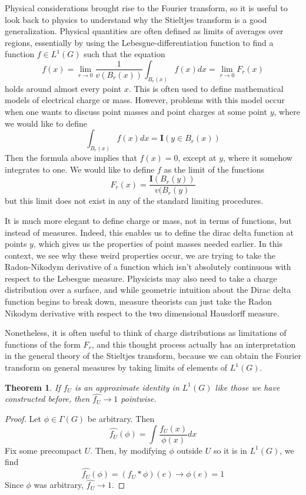 \documentclass{article}
\theoremstyle{plain}
\newtheorem{theorem}{Theorem}
\theoremstyle{definition}
\begin{document}
Physical considerations brought rise to the Fourier transform, so it is useful to look back to physics to understand why the Stieltjes transform is a good generalization. Physical quantities are often defined as limits of averages over regions, essentially by using the Lebesgue-differentiation function to find a function $f \in L^1(G)$ such that the equation
%
\[ f(x) = \lim_{r \to 0} \frac{1}{v(B_r(x))} \int_{B_r(x)} f(x) dx = \lim_{r \to 0} F_r(x) \]
%
holds around almost every point $x$. This is often used to define mathematical models of electrical charge or mass. However, problems with this model occur when one wants to discuss point masses and point charges at some point $y$, where we would like to define
%
\[ \int_{B_r(x)} f(x) dx = \mathbf{I}(y \in B_r(x)) \]
%
Then the formula above implies that $f(x) = 0$, except at $y$, where it somehow integrates to one. We would like to define $f$ as the limit of the functions
%
\[ F_r(x) = \frac{\mathbf{I}(B_r(y))}{v(B_r(y)} \]
%
but this limit does not exist in any of the standard limiting procedures.

It is much more elegant to define charge or mass, not in terms of functions, but instead of measures. Indeed, this enables us to define the dirac delta function at points $y$, which gives us the properties of point masses needed earlier. In this context, we see why these weird properties occur, we are trying to take the Radon-Nikodym derivative of a function which isn't absolutely continuous with respect to the Lebesgue measure. Physicists may also need to take a charge distribution over a surface, and while geometric intuition about the Dirac delta function begins to break down, measure theorists can just take the Radon Nikodym derivative with respect to the two dimensional Hausdorff measure.

Nonetheless, it is often useful to think of charge distributions as limitations of functions of the form $F_r$, and this thought process actually has an interpretation in the general theory of the Stieltjes transform, because we can obtain the Fourier transform on general measures by taking limits of elements of $L^1(G)$.

\begin{theorem}
    If $f_U$ is an approximate identity in $L^1(G)$ like those we have constructed before, then $\widehat{f_U} \to 1$ pointwise.
\end{theorem}
\begin{proof}
    Let $\phi \in \Gamma(G)$ be arbitrary. Then
    \[ \widehat{f_U}(\phi) = \int \frac{f_U(x)}{\phi(x)} dx \]
    Fix some precompact $U$. Then, by modifying $\phi$ outside $U$ so it is in $L^1(G)$, we find
    \[ \widehat{f_U}(\phi) = (f_U * \phi)(e) \to \phi(e) = 1 \]
    Since $\phi$ was arbitrary, $\widehat{f_U} \to 1$.
\end{proof}
\end{document}
